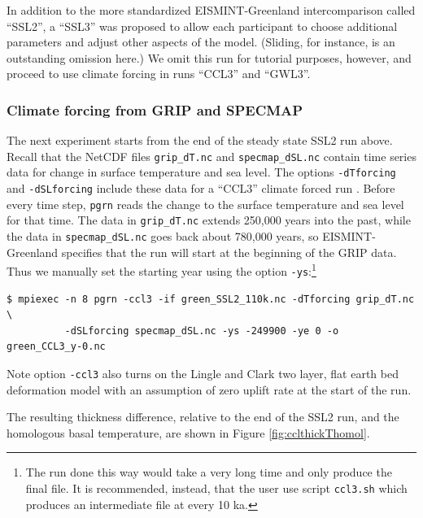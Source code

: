 \documentclass[11pt,final]{amsart}
\begin{document}
In addition to the more standardized EISMINT-Greenland intercomparison called ``SSL2'', a ``SSL3'' was proposed to allow each participant to choose additional parameters and adjust other aspects of the model.  (Sliding, for instance, is an outstanding omission here.)  We omit this run for tutorial purposes, however, and proceed to use climate forcing in runs ``CCL3'' and ``GWL3''.


\subsubsection*{Climate forcing from GRIP and SPECMAP}  The next experiment starts from the end of the steady state SSL2 run above.  Recall that the NetCDF files \verb|grip_dT.nc| and \verb|specmap_dSL.nc| contain time series data for change in surface temperature and sea level.  The options \verb|-dTforcing| and \verb|-dSLforcing| include these data for a ``CCL3'' climate forced run \cite{RitzEISMINT,HuybrechtsEISMINT}.  Before every time step, \verb|pgrn| reads the change to the surface temperature and sea level for that time.  The data in \verb|grip_dT.nc| extends 250,000 years into the past, while the data in \verb|specmap_dSL.nc| goes back about 780,000 years, so EISMINT-Greenland specifies that the run will start at the beginning of the GRIP data.  Thus we manually set the starting year using the option \verb|-ys|:\footnote{The run done this way would take a very long time and only produce the final file.  It is recommended, instead, that the user use script \texttt{ccl3.sh} which produces an intermediate file at every 10 ka.}

\begin{verbatim}
$ mpiexec -n 8 pgrn -ccl3 -if green_SSL2_110k.nc -dTforcing grip_dT.nc \
          -dSLforcing specmap_dSL.nc -ys -249900 -ye 0 -o green_CCL3_y-0.nc
\end{verbatim}
\noindent Note option \verb|-ccl3| also turns on the Lingle and Clark \cite{BLKfastearth,LingleClark} two layer, flat earth bed deformation model with an assumption of zero uplift rate at the start of the run.

The resulting thickness difference, relative to the end of the SSL2 run, and the homologous basal temperature, are shown in Figure \ref{fig:cclthickThomol}.
\end{document}
